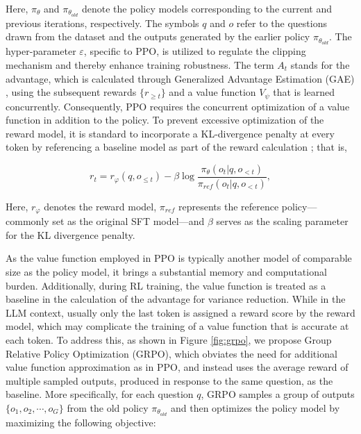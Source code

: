 \begin{itemize}[topsep=0pt]
\begin{itemize}[topsep=0pt]
Here, $\pi_{\theta}$ and $\pi_{\theta_{old}}$ denote the policy models corresponding to the current and previous iterations, respectively. The symbols $q$ and $o$ refer to the questions drawn from the dataset and the outputs generated by the earlier policy $\pi_{\theta_{old}}$. The hyper-parameter $\varepsilon$, specific to PPO, is utilized to regulate the clipping mechanism and thereby enhance training robustness. The term $A_t$ stands for the advantage, which is calculated through Generalized Advantage Estimation (GAE) \citep{gae}, using the subsequent rewards $\{r_{\ge t}\}$ and a value function $V_{\psi}$ that is learned concurrently. Consequently, PPO requires the concurrent optimization of a value function in addition to the policy. To prevent excessive optimization of the reward model, it is standard to incorporate a KL-divergence penalty at every token by referencing a baseline model as part of the reward calculation \citep{ouyang2022training}; that is,

\begin{equation}
    r_{t} = r_\varphi(q, o_{\le t}) - \beta \log\frac{\pi_{\theta}(o_{t}|q, o_{<t})}{\pi_{ref}(o_{t}|q, o_{<t})},
\label{eq:PPO-reward}
\end{equation}

Here, $r_\varphi$ denotes the reward model, $\pi_{ref}$ represents the reference policy—commonly set as the original SFT model—and $\beta$ serves as the scaling parameter for the KL divergence penalty.

As the value function employed in PPO is typically another model of comparable size as the policy model, it brings a substantial memory and computational burden. Additionally, during RL training, the value function is treated as a baseline in the calculation of the advantage for variance reduction. While in the LLM context, usually only the last token is assigned a reward score by the reward model, which may complicate the training of a value function that is accurate at each token. To address this, as shown in Figure \ref{fig:grpo}, we propose Group Relative Policy Optimization (GRPO), which obviates the need for additional value function approximation as in PPO, and instead uses the average reward of multiple sampled outputs, produced in response to the same question, as the baseline. More specifically, for each question $q$, GRPO samples a group of outputs $\{o_1, o_2, \cdots, o_G\}$  from the old policy  $\pi_{\theta_{old}}$  and then optimizes the policy model by maximizing the following objective:


\end{itemize}
\end{itemize}
